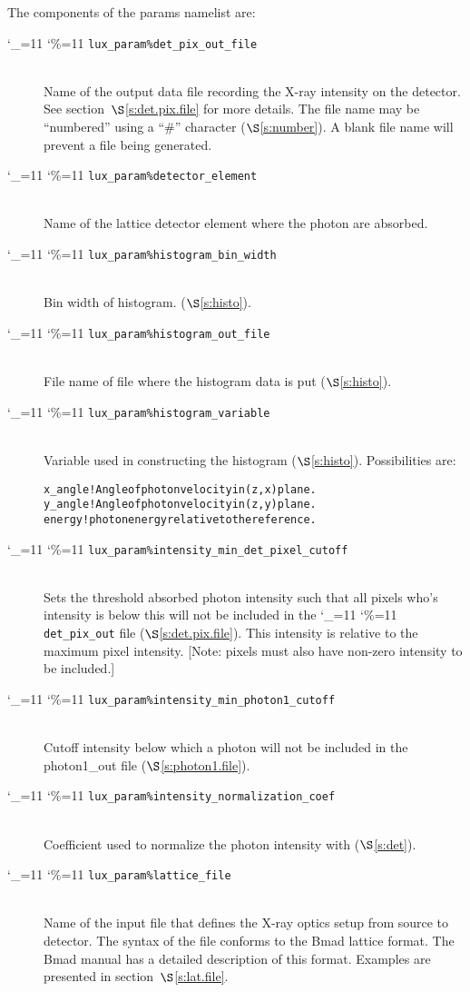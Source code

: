 \documentclass[11pt]{article}
\newcommand\ttcmd{\begingroup\catcode`\_=11 \catcode`\%=11 \dottcmd}
\newcommand\dottcmd[1]{\texttt{#1}\endgroup}
\newcommand{\vn}{\ttcmd}
\newcommand{\Newline}{\hfil \\}
\newcommand{\sref}[1]{$\S$\ref{#1}}
\newenvironment{example}
  {\vspace{\ExBeg} \begin{alltt}}
  {\end{alltt} \vspace{\ExEnd}}
\newlength{\ExBeg}
\newlength{\ExEnd}
\begin{document}
The components of the params namelist are:
  \begin{description}
  \item[\vn{lux_param\%det_pix_out_file}] \Newline
Name of the output data file recording the X-ray intensity on the
detector. See section~\sref{s:det.pix.file} for more details. The file
name may be ``numbered'' using a ``\#'' character (\sref{s:number}). A
blank file name will prevent a file being generated.

  \item[\vn{lux_param\%detector_element}] \Newline
Name of the lattice detector element where the photon are absorbed.

  \item[\vn{lux_param\%histogram_bin_width}] \Newline
Bin width of histogram. (\sref{s:histo}).

  \item[\vn{lux_param\%histogram_out_file}] \Newline
File name of file where the histogram data is put (\sref{s:histo}).

  \item[\vn{lux_param\%histogram_variable}] \Newline
Variable used in constructing the histogram (\sref{s:histo}).
Possibilities are:
\begin{example}
  x_angle      ! Angle of photon velocity in (z,x) plane.
  y_angle      ! Angle of photon velocity in (z,y) plane.
  energy       ! photon energy relative to the reference.
\end{example}

  \item[\vn{lux_param\%intensity_min_det_pixel_cutoff}] \Newline
Sets the threshold absorbed photon intensity such that all pixels
who's intensity is below this will not be included in the
\vn{det_pix_out} file (\sref{s:det.pix.file}). This intensity is
relative to the maximum pixel intensity. [Note: pixels must also have
non-zero intensity to be included.]

  \item[\vn{lux_param\%intensity_min_photon1_cutoff}] \Newline
Cutoff intensity below which a photon will not be included in
the photon1_out file (\sref{s:photon1.file}).

  \item[\vn{lux_param\%intensity_normalization_coef}] \Newline
Coefficient used to normalize the photon intensity with (\sref{s:det}).

  \item[\vn{lux_param\%lattice_file}] \Newline
Name of the input file that defines the X-ray optics setup from source
to detector. The syntax of the file conforms to the Bmad lattice
format. The Bmad manual has a detailed description of this format.
Examples are presented in section~\sref{s:lat.file}.


\end{description}
\end{document}
